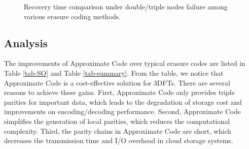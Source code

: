 \documentclass[sigconf]{acmart}
\begin{document}
\begin{figure}[ht]
\hspace{-4mm}

\caption{Recovery time comparison under double/triple nodes failure among various erasure coding methods.}\label{fig-recovery}

\end{figure}

\subsection{Analysis}
The improvements of Approximate Code over typical erasure codes are listed in Table \ref{tab-SO} and Table \ref{tab-summary}. From the table, we notice that Approximate Code is a cost-effective solution for 3DFTs. There are several reasons to achieve these gains. First, Approximate Code only provides triple parities for important data, which leads to the degradation of storage cost and improvements on encoding/decoding performance. Second, Approximate Code simplifies the generation of local parities, which reduces the computational complexity. Third, the parity chains in Approximate Code are short, which decreases the transmission time and I/O overhead in cloud storage systems.
\end{document}
